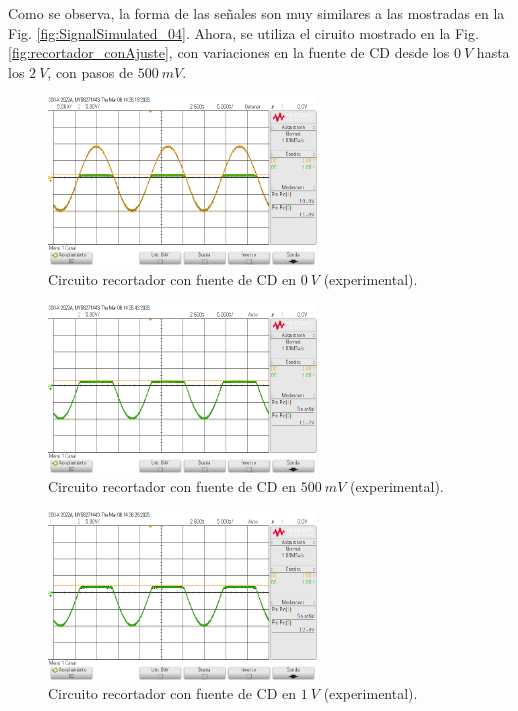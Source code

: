 \documentclass[journal]{IEEEtran}
\begin{document}
Como se observa, la forma de las señales son muy similares a las mostradas en la Fig. \ref{fig:SignalSimulated_04}. Ahora, se utiliza el ciruito mostrado en la Fig. \ref{fig:recortador_conAjuste}, 
con variaciones en la fuente de CD desde los $0~V$ hasta los $2~V$, con pasos de $500~mV$.

\begin{figure}[H]
        \centering
        \includegraphics[width=2.8in]{SignalExperimental_06.png}
        \caption{Circuito recortador con fuente de CD en $0~V$ (experimental).}
        \label{fig:SignalExperimental_06}
\end{figure}
\begin{figure}[H]
        \centering
        \includegraphics[width=2.8in]{SignalExperimental_07.png}
        \caption{Circuito recortador con fuente de CD en $500~mV$ (experimental).}
        \label{fig:SignalExperimental_07}
\end{figure}
\begin{figure}[H]
        \centering
        \includegraphics[width=2.8in]{SignalExperimental_08.png}
        \caption{Circuito recortador con fuente de CD en $1~V$ (experimental).}
        \label{fig:SignalExperimental_08}
\end{figure}
\end{document}
